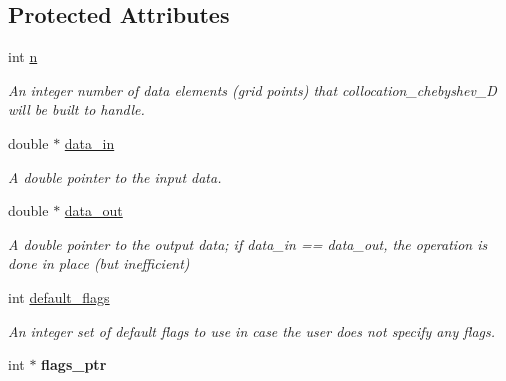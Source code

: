 \subsection*{Protected Attributes}
\begin{DoxyCompactItemize}
\item 
\hypertarget{classexplicit__plan_a078dbf8f03ba12e9cca409dae7d34de5}{int \hyperlink{classexplicit__plan_a078dbf8f03ba12e9cca409dae7d34de5}{n}}\label{classexplicit__plan_a078dbf8f03ba12e9cca409dae7d34de5}

\begin{DoxyCompactList}\small\item\em An integer number of data elements (grid points) that collocation\-\_\-chebyshev\-\_\-D will be built to handle. \end{DoxyCompactList}\item 
\hypertarget{classexplicit__plan_a3c2d15939b99a9570088fd93e650828e}{double $\ast$ \hyperlink{classexplicit__plan_a3c2d15939b99a9570088fd93e650828e}{data\-\_\-in}}\label{classexplicit__plan_a3c2d15939b99a9570088fd93e650828e}

\begin{DoxyCompactList}\small\item\em A double pointer to the input data. \end{DoxyCompactList}\item 
\hypertarget{classexplicit__plan_a69d39b11f26cb90bda001bd76530a6ac}{double $\ast$ \hyperlink{classexplicit__plan_a69d39b11f26cb90bda001bd76530a6ac}{data\-\_\-out}}\label{classexplicit__plan_a69d39b11f26cb90bda001bd76530a6ac}

\begin{DoxyCompactList}\small\item\em A double pointer to the output data; if data\-\_\-in == data\-\_\-out, the operation is done in place (but inefficient) \end{DoxyCompactList}\item 
\hypertarget{classplan_a14f8cce3065ed97f0909eda7b62ca1dc}{int \hyperlink{classplan_a14f8cce3065ed97f0909eda7b62ca1dc}{default\-\_\-flags}}\label{classplan_a14f8cce3065ed97f0909eda7b62ca1dc}

\begin{DoxyCompactList}\small\item\em An integer set of default flags to use in case the user does not specify any flags. \end{DoxyCompactList}\item 
\hypertarget{classplan_ada18dc9e93c6833cd8c0d228598e20db}{int $\ast$ {\bfseries flags\-\_\-ptr}}\label{classplan_ada18dc9e93c6833cd8c0d228598e20db}

\end{DoxyCompactItemize}


